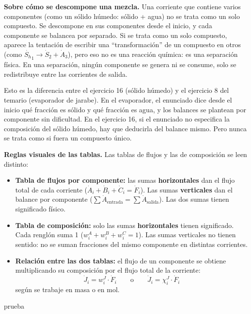 \begin{notaimportante}
\textbf{Sobre cómo se descompone una mezcla.} Una corriente que
contiene varios componentes (como un sólido húmedo: sólido + agua)
no se trata como un solo compuesto. Se descompone en sus
componentes desde el inicio, y cada componente se balancea por
separado. Si se trata como un solo compuesto, aparece la tentación
de escribir una ``transformación'' de un compuesto en otros
(como $\dot{S_h}_1 \to \dot{S}_2 + \dot{A}_3$), pero eso no es
una reacción química: es una separación física. En una separación,
ningún componente se genera ni se consume, solo se redistribuye
entre las corrientes de salida.

Esto es la diferencia entre el ejercicio 16 (sólido húmedo) y el
ejercicio 8 del temario (evaporador de jarabe). En el evaporador,
el enunciado dice desde el inicio qué fracción es sólido y qué
fracción es agua, y los balances se plantean por componente sin
dificultad. En el ejercicio 16, si el enunciado no especifica la
composición del sólido húmedo, hay que deducirla del balance
mismo. Pero nunca se trata como si fuera un compuesto único.
\end{notaimportante}

\begin{notafija}
\textbf{Reglas visuales de las tablas.} Las tablas de flujos y las de
composición se leen distinto:

\begin{itemize}
    \item \textbf{Tabla de flujos por componente:} las sumas
    \textbf{horizontales} dan el flujo total de cada corriente
    ($\dot{A}_i + \dot{B}_i + \dot{C}_i = \dot{F}_i$). Las sumas
    \textbf{verticales} dan el balance por componente
    ($\sum \dot{A}_{\text{entrada}} = \sum \dot{A}_{\text{salida}}$).
    Las dos sumas tienen significado físico.

    \item \textbf{Tabla de composición:} solo las sumas
    \textbf{horizontales} tienen significado. Cada renglón suma 1
    ($w_i^A + w_i^B + w_i^C = 1$). Las sumas verticales no tienen
    sentido: no se suman fracciones del mismo componente en
    distintas corrientes.

    \item \textbf{Relación entre las dos tablas:} el flujo de un
    componente se obtiene multiplicando su composición por el flujo
    total de la corriente:
    \[
    \dot{J}_i = w_i^J \cdot \dot{F}_i
    \qquad \text{o} \qquad
    \dot{J}_i = \chi_i^J \cdot \dot{F}_i
    \]
    según se trabaje en masa o en mol.
\end{itemize}
\end{notafija}

prueba